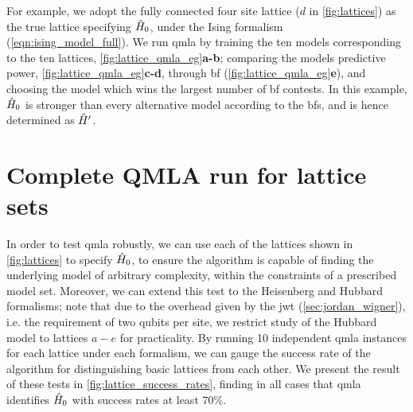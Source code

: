 For example, we adopt the fully connected four site lattice ($d$ in \cref{fig:lattices})
    as the true lattice specifying $\hat{H}_0$, under the Ising formalism (\cref{eqn:ising_model_full}).
We run \gls{qmla} by training the ten models corresponding to the ten lattices,  \cref{fig:lattice_qmla_eg}\textbf{a-b};
    comparing the models predictive power, \cref{fig:lattice_qmla_eg}\textbf{c-d},
    through \gls{bf} (\cref{fig:lattice_qmla_eg}\textbf{e}), 
    and choosing the model which wins the largest number of \gls{bf} contests. 
In this example, $\hat{H}_0$ is stronger than every alternative model according to the \glspl{bf}, 
    and is hence determined as $\hat{H}^{\prime}$. 

\section{Complete QMLA run for lattice sets}
In order to test \gls{qmla} robustly, 
    we can use each of the lattices shown in \cref{fig:lattices} to specify $\hat{H}_0$, 
    to ensure the algorithm is capable of finding the underlying model of arbitrary complexity, 
    within the constraints of a prescribed model set\footnotemark. 
Moreover, we can extend this test to the Heisenberg and Hubbard formalisms; 
    note that due to the overhead given by the \gls{jwt} (\cref{sec:jordan_wigner}), i.e. the requirement of two qubits per site, 
    we restrict study of the Hubbard model to lattices $a-e$ for practicality\footnotemark.
By running 10 independent \gls{qmla} \glspl{instance} for each lattice under each formalism,
    we can gauge the success rate of the algorithm for distinguishing basic lattices from each other. 
We present the result of these tests in \cref{fig:lattice_success_rates},   
    finding in all cases that \gls{qmla} identifies $\hat{H}_0$ with success rates at least $70\%$. 
